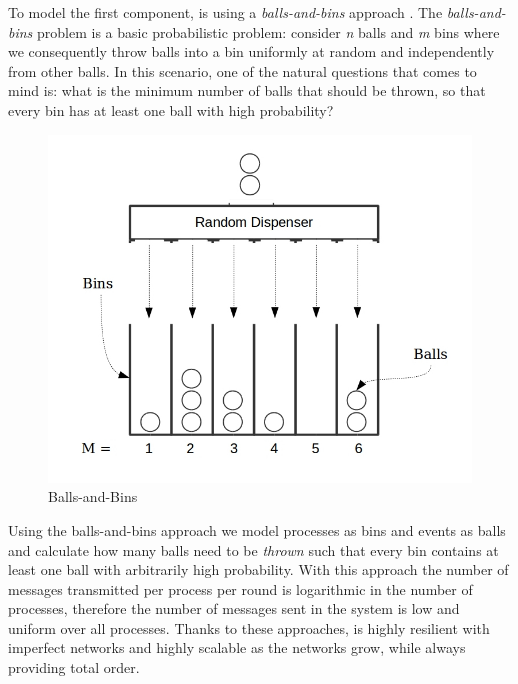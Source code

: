 \par
To model the first component, \epto is using a \textit{balls-and-bins} approach \autocite{Koldehofe02simplegossiping}. The \textit{balls-and-bins} problem is a basic probabilistic problem: consider \textit{n} balls and \textit{m} bins where we consequently throw balls into a bin uniformly at random and independently from other balls. In this scenario, one of the natural questions that comes to mind is: what is the minimum number of balls that should be thrown, so that every bin has at least one ball with high probability?
\begin{figure}
	\includegraphics[width=\linewidth]{figures/BnB.jpeg}
	\caption[Caption]{Balls-and-Bins\footnotemark}
	\label{fig:balls-and-bins}
\end{figure}
\par
Using the balls-and-bins approach we model processes as bins and events as balls and calculate how many balls need to be \textit{thrown} such that every bin contains at least one ball with arbitrarily high probability. With this approach the number of messages transmitted per process per round is logarithmic in the number of processes, therefore the number of messages sent in the system is low and uniform over all processes. Thanks to these approaches, \epto is highly resilient with  imperfect networks and highly scalable as the networks grow, while always providing total order. \par
